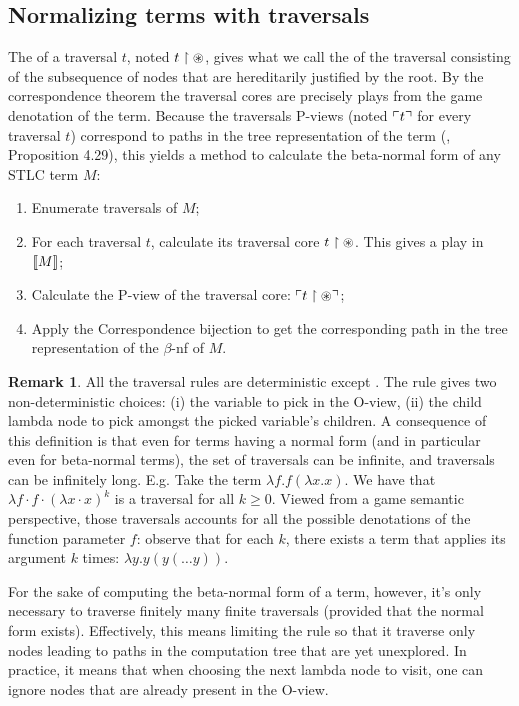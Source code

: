 \documentclass{article}
\theoremstyle{definition}
\newtheorem{remark}{Remark}[section]
\begin{document}
\subsection{Normalizing terms with traversals}

The  of a traversal $t$, noted $t\upharpoonright {\circledast}$, gives what we call the  of the traversal consisting of the subsequence of nodes that are hereditarily justified by the root. By the correspondence theorem the traversal cores are precisely plays from the game denotation of the term.
Because the traversals P-views (noted $\ulcorner t \urcorner$ for every traversal $t$) correspond to paths in the tree representation of the term (\cite{BlumPhd}, Proposition 4.29), this yields a method to calculate the beta-normal form of any STLC term $M$:
\begin{enumerate}
  \item Enumerate traversals of $M$;
  \item For each traversal $t$, calculate its traversal core $t \upharpoonright \circledast$. This gives a play in ${[\![ M ]\!]}$;
  \item Calculate the P-view of the traversal core: $\ulcorner t\upharpoonright \circledast \urcorner$;
  \item Apply the Correspondence bijection to get the corresponding path in the tree representation of the $\beta$-nf of $M$.
\end{enumerate}


\begin{remark}
All the traversal rules are deterministic except . The rule  gives two non-deterministic choices: (i) the variable to pick in the O-view,
(ii) the child lambda node to pick amongst the picked variable's children.
A consequence of this definition is that even for terms having a normal form (and in particular even for beta-normal terms), the set of traversals can be infinite, and traversals can be infinitely long.
E.g. Take the term $\lambda f . f (\lambda x. x)$. We have that $\lambda f \cdot f \cdot (\lambda x \cdot  x)^k$ is a traversal for all $k\geq0$. Viewed from a game semantic perspective, those traversals accounts for all the possible denotations of the function parameter $f$: observe that for each $k$, there exists a term that applies its argument $k$ times: $\lambda y . y (y ( \ldots y)) $.

For the sake of computing the beta-normal form of a term, however, it's only necessary to traverse finitely many finite traversals (provided that the normal form exists). Effectively, this means limiting the rule  so that it traverse only nodes leading to paths in the computation tree that are yet unexplored. In practice, it means that when choosing the next lambda node to visit, one can ignore nodes that are already present in the O-view.
\end{remark}
\end{document}
